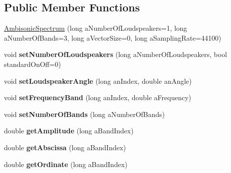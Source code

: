 \subsection*{Public Member Functions}
\begin{DoxyCompactItemize}
\item 
\hyperlink{class_ambisonic_spectrum_a657f2c97aaab215e95c41f4d07dc8f45}{Ambisonic\-Spectrum} (long a\-Number\-Of\-Loudspeakers=1, long a\-Number\-Of\-Bands=3, long a\-Vector\-Size=0, long a\-Sampling\-Rate=44100)
\item 
\hypertarget{class_ambisonic_spectrum_a67322d6da539d8804711830108289890}{void {\bfseries set\-Number\-Of\-Loudspeakers} (long a\-Number\-Of\-Loudspeakers, bool standard\-On\-Off=0)}\label{class_ambisonic_spectrum_a67322d6da539d8804711830108289890}

\item 
\hypertarget{class_ambisonic_spectrum_a35509a66a23a341cb3fe8db5509cd60c}{void {\bfseries set\-Loudspeaker\-Angle} (long an\-Index, double an\-Angle)}\label{class_ambisonic_spectrum_a35509a66a23a341cb3fe8db5509cd60c}

\item 
\hypertarget{class_ambisonic_spectrum_ae50e8aebafb67fc1883b1b4343c69018}{void {\bfseries set\-Frequency\-Band} (long an\-Index, double a\-Frequency)}\label{class_ambisonic_spectrum_ae50e8aebafb67fc1883b1b4343c69018}

\item 
\hypertarget{class_ambisonic_spectrum_a21fb69a71c815e1ab5bf350668b5dc0c}{void {\bfseries set\-Number\-Of\-Bands} (long a\-Number\-Of\-Bands)}\label{class_ambisonic_spectrum_a21fb69a71c815e1ab5bf350668b5dc0c}

\item 
\hypertarget{class_ambisonic_spectrum_abde7474b423c03a64a4f810dac2805c6}{double {\bfseries get\-Amplitude} (long a\-Band\-Index)}\label{class_ambisonic_spectrum_abde7474b423c03a64a4f810dac2805c6}

\item 
\hypertarget{class_ambisonic_spectrum_a2c98b11e9e41def8f7d6e24ef34a144c}{double {\bfseries get\-Abscissa} (long a\-Band\-Index)}\label{class_ambisonic_spectrum_a2c98b11e9e41def8f7d6e24ef34a144c}

\item 
\hypertarget{class_ambisonic_spectrum_a7d91f3340282b610dca8f5d6133029f5}{double {\bfseries get\-Ordinate} (long a\-Band\-Index)}\label{class_ambisonic_spectrum_a7d91f3340282b610dca8f5d6133029f5}


\end{DoxyCompactItemize}
